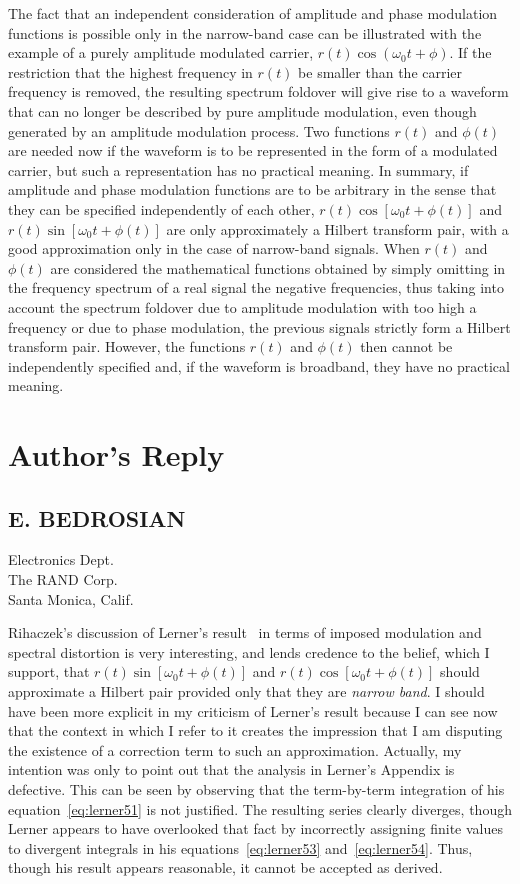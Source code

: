 \documentclass[11pt]{article}
\begin{document}
The fact that an independent consideration of amplitude and phase modulation functions is possible only in the narrow-band case can be illustrated with the example of a purely amplitude modulated carrier, $r(t) \cos(\omega_0 t + \phi)$. If the restriction that the highest frequency in $r(t)$ be smaller than the carrier frequency is removed, the resulting spectrum foldover will give rise to a waveform that can no longer be described by pure amplitude modulation, even though generated by an amplitude modulation process. Two functions $r(t)$ and $\phi(t)$ are needed now if the waveform is to be represented in the form of a modulated carrier, but such a representation has no practical meaning. In summary, if amplitude and phase modulation functions are to be arbitrary in the sense that they can be specified independently of each other, $r(t) \cos[\omega_0 t + \phi(t)]$ and $r(t) \sin[\omega_0 t + \phi(t)]$ are only approximately a Hilbert transform pair, with a good approximation only in the case of narrow-band signals. When $r(t)$ and $\phi(t)$ are considered the mathematical functions obtained by simply omitting in the frequency spectrum of a real signal the negative frequencies, thus taking into account the spectrum foldover due to amplitude modulation with too high a frequency or due to phase modulation, the previous signals strictly form a Hilbert transform pair. However, the functions $r(t)$ and $\phi(t)$ then cannot be independently specified and, if the waveform is broadband, they have no practical meaning.

\section{Author's Reply}
\label{sec:author_reply}

\subsection{E. BEDROSIAN}
\label{subsec:bedrosian_reply}

Electronics Dept.\\
The RAND Corp.\\
Santa Monica, Calif.

Rihaczek's discussion of Lerner's result~\cite{lerner1960} in terms of imposed modulation and spectral distortion is very interesting, and lends credence to the belief, which I support, that $r(t) \sin[\omega_0 t + \phi(t)]$ and $r(t) \cos[\omega_0 t + \phi(t)]$ should approximate a Hilbert pair provided only that they are \emph{narrow band}. I should have been more explicit in my criticism of Lerner's result because I can see now that the context in which I refer to it creates the impression that I am disputing the existence of a correction term to such an approximation. Actually, my intention was only to point out that the analysis in Lerner's Appendix is defective. This can be seen by observing that the term-by-term integration of his equation~\eqref{eq:lerner51} is not justified. The resulting series clearly diverges, though Lerner appears to have overlooked that fact by incorrectly assigning finite values to divergent integrals in his equations~\eqref{eq:lerner53} and~\eqref{eq:lerner54}. Thus, though his result appears reasonable, it cannot be accepted as derived.
\end{document}
